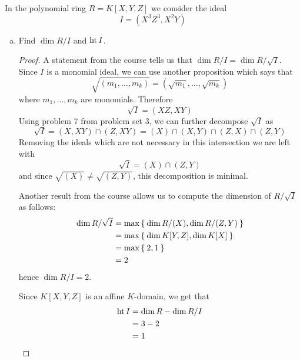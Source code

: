 \begin{comment}
    By problem 8 of problem set 1, the only maximal ideal generated by monomials is \((X_1, \dots, X_n)\). Therefore \(p_1 = p_2 = \dots = p_n = (X_1, \dots, X_n)\). But this means that
    \[
        \sqrt{I} = (X_1, \dots, X_n)
    \]
    which, by the maximality of \(X_1, \dots, X_n\), shows that \(I\) is \((X_1, \dots, X_n)\)-primary.
    
    \item[\(b \implies c\)] %
    
    \item[\(c \implies a\)] %
\end{itemize}
\end{proof}
\end{problem*}
\end{comment}

\begin{problem*}{3}
In the polynomial ring \(R = K[X, Y, Z]\) we consider the ideal
\[
    I = (X^3 Z^3, X^2 Y)
\]
\begin{enumerate}[(a)]
    \item Find \(\dim R/I\) and \(\operatorname{ht} I\).
    \begin{proof}
    A statement from the course tells us that \(\dim R/I = \dim R/\sqrt{I}\). Since \(I\) is a monomial ideal, we can use another proposition which says that
    \[
        \sqrt{(m_1, \dots, m_k)} = \left(\sqrt{m_1}, \dots, \sqrt{m_k}\right)
    \]
    where \(m_1, \dots, m_k\) are monomials. Therefore
    \[
        \sqrt{I} = (XZ, XY)
    \]
    Using problem 7 from problem set 3, we can further decompose \(\sqrt{I}\) as
    \[
        \sqrt{I} = (X, XY) \cap (Z, XY) = (X) \cap (X, Y) \cap (Z, X) \cap (Z, Y)
    \]
    Removing the ideals which are not necessary in this intersection we are left with
    \[
        \sqrt{I} = (X) \cap (Z, Y)
    \]
    and since \(\sqrt{(X)} \neq \sqrt{(Z, Y)}\), this decomposition is minimal.
    
    Another result from the course allows us to compute the dimension of \(R/\sqrt{I}\) as follows:
    \begin{align*}
        \dim R/\sqrt{I} &= \max \Set{ \dim R/(X), \dim R/(Z, Y) } \\
        &= \max \Set{ \dim K[Y, Z], \dim K[X] } \\
        &= \max \Set{ 2, 1 } \\
        &= 2
    \end{align*}
    hence \(\dim R/I = 2\).
    
    Since \(K[X, Y, Z]\) is an affine \(K\)-domain, we get that
    \begin{align*}
        \operatorname{ht} I &= \dim R - \dim R/I \\
        &= 3 - 2 \\
        &= 1
    \end{align*}
    \end{proof}
    

\end{enumerate}
\end{problem*}

